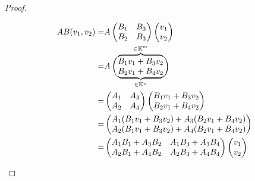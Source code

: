 \begin{proof}
\begin{parts}
		{\allowdisplaybreaks
		\begin{align*}
			AB(v_1,v_2)=&A\begin{pmatrix} B_1 & B_3 \\ B_2 & B_3 \end{pmatrix}\begin{pmatrix} v_1 \\ v_2 \end{pmatrix} \\ 
			=&A\begin{pmatrix} \smash{\overbrace{B_1v_1+B_3v_2}^{\in\mathbb{K}^m}}\vphantom{B_1v_1}\\ \smash{\underbrace{B_2v_1+B_4v_2}_{\in\mathbb{K}^n}}\vphantom{B_1v_1} \end{pmatrix} \vphantom{\begin{pmatrix} \overbrace{B_1v_1}^{\in \mathbb{K}^a}\\ \underbrace{B_1V_1}_{\in\mathbb{K}^a} \end{pmatrix} } \\
			=&\begin{pmatrix} A_1 & A_3 \\ A_2 & A_4 \end{pmatrix}\begin{pmatrix} B_1v_1+B_3v_2\\B_2v_1+B_4v_2 \end{pmatrix} \\
			=&\begin{pmatrix} A_1(B_1v_1+B_3v_2)+A_3(B_2v_1+B_4v_2)\\ A_2(B_1v_1+B_3v_2)+A_4(B_2v_1+B_4v_2) \end{pmatrix}\\
			=&\begin{pmatrix} A_1B_1+A_3B_2 & A_1B_3+A_3B_4 \\ A_2B_1+A_4B_2 & A_2B_3+A_4B_4 \end{pmatrix} \begin{pmatrix} v_1 \\ v_2 \end{pmatrix} \qedhere
		\end{align*}
	}
	\end{parts}
\end{proof}
